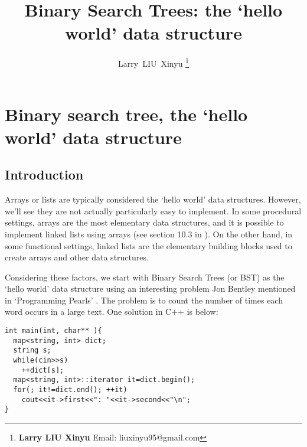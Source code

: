 \documentclass{article}
\begin{document}


\title{Binary Search Trees: the `hello world' data structure}

\author{Larry~LIU~Xinyu
\thanks{{\bfseries Larry LIU Xinyu } \newline
  Email: liuxinyu95@gmail.com \newline}
  }

\maketitle
\fi


\ifx\wholebook\relax
\chapter{Binary search tree, the `hello world' data structure}
\fi

\section{Introduction}
\label{introduction} 

Arrays or lists are typically considered the `hello world' data structures.
However, we'll see they are not actually particularly easy to implement. In some procedural
settings, arrays are the most elementary data structures, and it is possible to implement
linked lists using arrays (see section 10.3 in \cite{CLRS}). On the other hand, in some functional settings,
linked lists are the elementary building blocks used to create arrays and other data structures.

Considering these factors, we start with Binary Search Trees (or BST) as the `hello world'
data structure using an interesting problem Jon Bentley mentioned in `Programming Pearls'
\cite{Bentley}. The problem is to count the number of times each word occurs
in a large text. One solution in C++ is below:

\lstset{language=C++}
\begin{lstlisting}
int main(int, char** ){
  map<string, int> dict;
  string s;
  while(cin>>s)
    ++dict[s];
  map<string, int>::iterator it=dict.begin();
  for(; it!=dict.end(); ++it)
    cout<<it->first<<": "<<it->second<<"\n";
}
\end{lstlisting}
\end{document}
